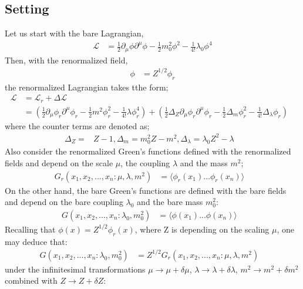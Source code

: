 \documentclass[fleqn]{article}
\begin{document}
\subsection{Setting}
Let us start with the bare Lagrangian,
\begin{align}
\mathcal{L} &= \frac{1}{2}\partial_\mu \phi \partial^{\mu} \phi - \frac{1}{2}m_0^{2}\phi ^{2} - \frac{1}{4!} \lambda_0 \phi^{4}
\end{align}
Then, with the renormalized field,
\begin{align}
\phi &= Z^{1/2} \phi _r
\end{align}
the renormalized Lagrangian takes tthe form;
\begin{align}
\mathcal{L} &= \mathcal{L}_r + \Delta \mathcal{L} \nonumber  &\\
&= (\frac{1}{2}\partial _\mu \phi_r \partial ^{\mu} \phi_r - \frac{1}{2}m^{2}\phi_r ^{2} - \frac{1}{4!}\lambda \phi_r ^{4}) + (\frac{1}{2} \Delta_Z \partial_\mu \phi_r \partial^{\mu} \phi_r- \frac{1}{2}\Delta_m \phi_r ^{2} - \frac{1}{4!}\Delta _{\lambda} \phi_r)&
\end{align}
where the counter terms are denoted as;
\begin{align}
\Delta_Z =& Z-1, \Delta_m = m_0 ^{2} Z -m^{2}, \Delta _{\lambda} = \lambda_0 Z^{2} - \lambda&
\end{align}
Also consider the renormalized Green's functions defined with the renormalized fields and depend on the scale $\mu$, the coupling $\lambda$ and the mass $m^{2}$;
\begin{align}
\textit{G}_r(x_1,x_2,...,x_n:\mu, \lambda, m^{2} ) &= \langle \phi_r(x_1) ... \phi_r(x_n) \rangle&
\end{align}
On the other hand, the bare Green's functions are defined with the bare fields and depend on the bare coupling $\lambda _0$ and the bare mass $m_0^{2}$:
\begin{align}
\textit{G}(x_1,x_2,...,x_n: \lambda_0, m_0^{2} ) &= \langle \phi(x_1) ... \phi(x_n) \rangle&
\end{align}
Recalling that $\phi(x) = Z^{1/2} \phi_r (x)$, where Z is depending on the scaling $\mu$, one may deduce that:
\begin{align}
\textit{G}(x_1,x_2,...,x_n: \lambda_0, m_0^{2} ) &=  Z^{1/2} \textit{G}_r(x_1,x_2,...,x_n:\mu, \lambda, m^{2} ) &
\end{align}
under the infinitesimal transformations $\mu \rightarrow \mu + \delta \mu$, $\lambda \rightarrow \lambda +\delta \lambda$, $m^{2} \rightarrow m^{2} + \delta m^{2}$ combined with $Z \rightarrow Z + \delta Z$:
\end{document}
